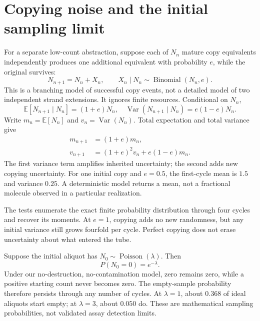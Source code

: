 \section{Copying noise and the initial sampling limit}
For a separate low-count abstraction, suppose each of $N_n$ mature copy equivalents independently produces one additional equivalent with probability $e$, while the original survives:
\begin{equation}
N_{n+1}=N_n+X_n,\qquad X_n\mid N_n\sim\operatorname{Binomial}(N_n,e).
\end{equation}
This is a branching model of successful copy events, not a detailed model of two independent strand extensions. It ignores finite resources. Conditional on $N_n$,
\begin{equation}
\mathbb E[N_{n+1}\mid N_n]=(1+e)N_n,\quad
\operatorname{Var}(N_{n+1}\mid N_n)=e(1-e)N_n.
\end{equation}
Write $m_n=\mathbb E[N_n]$ and $v_n=\operatorname{Var}(N_n)$. Total expectation and total variance give
\begin{align}
m_{n+1}&=(1+e)m_n,\\
v_{n+1}&=(1+e)^2v_n+e(1-e)m_n. \label{eq:variance}
\end{align}
The first variance term amplifies inherited uncertainty; the second adds new copying uncertainty. For one initial copy and $e=0.5$, the first-cycle mean is $1.5$ and variance $0.25$. A deterministic model returns a mean, not a fractional molecule observed in a particular realization.

The tests enumerate the exact finite probability distribution through four cycles and recover its moments. At $e=1$, copying adds no new randomness, but any initial variance still grows fourfold per cycle. Perfect copying does not erase uncertainty about what entered the tube.

Suppose the initial aliquot has $N_0\sim\operatorname{Poisson}(\lambda)$. Then
\begin{equation}
P(N_0=0)=e^{-\lambda}.
\end{equation}
Under our no-destruction, no-contamination model, zero remains zero, while a positive starting count never becomes zero. The empty-sample probability therefore persists through any number of cycles. At $\lambda=1$, about $0.368$ of ideal aliquots start empty; at $\lambda=3$, about $0.050$ do. These are mathematical sampling probabilities, not validated assay detection limits.

